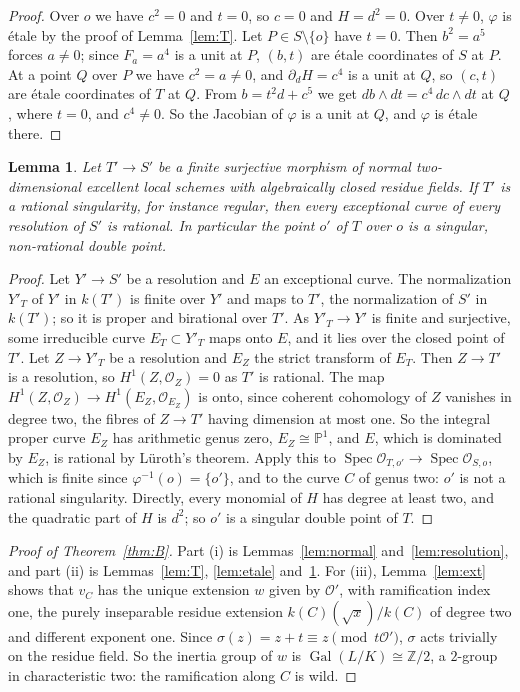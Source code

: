 \documentclass[11pt,a4paper]{article}
\newtheorem{lemma}{Lemma}[section]
\theoremstyle{definition}
\newcommand{\PP}{\mathbb{P}}
\newcommand{\Z}{\mathbb{Z}}
\newcommand{\cO}{\mathcal{O}}
\newcommand{\Spec}{\operatorname{Spec}}
\newcommand{\Gal}{\operatorname{Gal}}
\begin{document}
\begin{proof}
Over $o$ we have $c^2=0$ and $t=0$, so $c=0$ and $H=d^2=0$. Over $t\ne0$,
$\varphi$ is \'etale by the proof of Lemma~\ref{lem:T}. Let $P\in
S\setminus\{o\}$ have $t=0$. Then $b^2=a^5$ forces $a\ne0$; since $F_a=a^4$
is a unit at $P$, $(b,t)$ are \'etale coordinates of $S$ at $P$. At a point
$Q$ over $P$ we have $c^2=a\ne0$, and $\partial_dH=c^4$ is a unit at $Q$, so
$(c,t)$ are \'etale coordinates of $T$ at $Q$. From $b=t^2d+c^5$ we get
$db\wedge dt=c^4\,dc\wedge dt$ at $Q$, where $t=0$, and $c^4\ne0$. So the
Jacobian of $\varphi$ is a unit at $Q$, and $\varphi$ is \'etale there.
\end{proof}

\begin{lemma}\label{lem:rational}
Let $T'\to S'$ be a finite surjective morphism of normal two-dimensional
excellent local schemes with algebraically closed residue fields. If $T'$ is
a rational singularity, for instance regular, then every exceptional curve of
every resolution of $S'$ is rational. In particular the point $o'$ of $T$
over $o$ is a singular, non-rational double point.
\end{lemma}

\begin{proof}
Let $Y'\to S'$ be a resolution and $E$ an exceptional curve. The
normalization $Y'_T$ of $Y'$ in $k(T')$ is finite over $Y'$ and maps to
$T'$, the normalization of $S'$ in $k(T')$; so it is proper and birational
over $T'$. As $Y'_T\to Y'$ is finite and surjective, some irreducible curve
$E_T\subset Y'_T$ maps onto $E$, and it lies over the closed point of $T'$.
Let $Z\to Y'_T$ be a resolution and $E_Z$ the strict transform of $E_T$.
Then $Z\to T'$ is a resolution, so $H^1(Z,\cO_Z)=0$ as $T'$ is rational. The
map $H^1(Z,\cO_Z)\to H^1(E_Z,\cO_{E_Z})$ is onto, since coherent cohomology
of $Z$ vanishes in degree two, the fibres of $Z\to T'$ having dimension at
most one. So the integral proper curve $E_Z$ has arithmetic genus zero,
$E_Z\cong\PP^1$, and $E$, which is dominated by $E_Z$, is rational by
L\"uroth's theorem. Apply this to $\Spec\cO_{T,o'}\to\Spec\cO_{S,o}$, which is
finite since $\varphi^{-1}(o)=\{o'\}$, and to the curve $C$ of genus two:
$o'$ is not a rational singularity. Directly, every monomial of $H$ has
degree at least two, and the quadratic part of $H$ is $d^2$; so $o'$ is a
singular double point of $T$.
\end{proof}

\begin{proof}[Proof of Theorem~\ref{thm:B}]
Part (i) is Lemmas~\ref{lem:normal} and~\ref{lem:resolution}, and part (ii)
is Lemmas~\ref{lem:T}, \ref{lem:etale} and~\ref{lem:rational}. For (iii), Lemma~\ref{lem:ext}
shows that $v_C$ has the unique extension $w$ given by $\cO'$, with
ramification index one, the purely inseparable residue extension
$k(C)(\sqrt{x})/k(C)$ of degree two and different exponent one. Since
$\sigma(z)=z+t\equiv z\pmod{t\cO'}$, $\sigma$ acts trivially on the residue
field. So the inertia group of $w$ is $\Gal(L/K)\cong\Z/2$, a $2$-group in
characteristic two: the ramification along $C$ is wild.
\end{proof}
\end{document}
